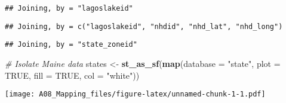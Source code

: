 \documentclass[]{article}
\newenvironment{Shaded}{\begin{snugshade}}{\end{snugshade}}
\newcommand{\CommentTok}[1]{\textcolor[rgb]{0.56,0.35,0.01}{\textit{#1}}}
\newcommand{\DataTypeTok}[1]{\textcolor[rgb]{0.13,0.29,0.53}{#1}}
\newcommand{\DecValTok}[1]{\textcolor[rgb]{0.00,0.00,0.81}{#1}}
\newcommand{\KeywordTok}[1]{\textcolor[rgb]{0.13,0.29,0.53}{\textbf{#1}}}
\newcommand{\NormalTok}[1]{#1}
\newcommand{\OperatorTok}[1]{\textcolor[rgb]{0.81,0.36,0.00}{\textbf{#1}}}
\newcommand{\OtherTok}[1]{\textcolor[rgb]{0.56,0.35,0.01}{#1}}
\newcommand{\StringTok}[1]{\textcolor[rgb]{0.31,0.60,0.02}{#1}}
\begin{document}
\begin{verbatim}
## Joining, by = "lagoslakeid"
\end{verbatim}

\begin{verbatim}
## Joining, by = c("lagoslakeid", "nhdid", "nhd_lat", "nhd_long")
\end{verbatim}

\begin{verbatim}
## Joining, by = "state_zoneid"
\end{verbatim}

\begin{Shaded}
\begin{Highlighting}[]
\CommentTok{# Isolate Maine data}
\NormalTok{states <-}\StringTok{ }\KeywordTok{st_as_sf}\NormalTok{(}\KeywordTok{map}\NormalTok{(}\DataTypeTok{database =} \StringTok{"state"}\NormalTok{, }\DataTypeTok{plot =} \OtherTok{TRUE}\NormalTok{, }
                       \DataTypeTok{fill =} \OtherTok{TRUE}\NormalTok{, }\DataTypeTok{col =} \StringTok{"white"}\NormalTok{))}
\end{Highlighting}
\end{Shaded}

\texttt{[image: A08\_Mapping\_files/figure-latex/unnamed-chunk-1-1.pdf]}

\begin{Shaded}
\end{Shaded}
\end{document}
